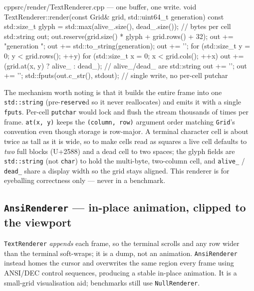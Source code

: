 \documentclass[
	english,
	letterpaper, oneside
]{article}
\begin{document}
\begin{sourcecode}{cpp}{src/render/TextRenderer.cpp --- one buffer, one write.}
void TextRenderer::render(const Grid& grid, std::uint64_t generation) {
  const std::size_t glyph = std::max(alive_.size(), dead_.size()); // bytes per cell
  std::string out;
  out.reserve(grid.size() * glyph + grid.rows() + 32);
  out += "generation "; out += std::to_string(generation); out += '\n';
  for (std::size_t y = 0; y < grid.rows(); ++y) {
    for (std::size_t x = 0; x < grid.cols(); ++x)
      out += (grid.at(x, y) ? alive_ : dead_);   // alive_/dead_ are std::string
    out += '\n';
  }
  out += '\n';
  std::fputs(out.c_str(), stdout);               // single write, no per-cell putchar
}
\end{sourcecode}

The mechanism worth noting is that it builds the entire frame into one
\texttt{std::string} (pre-\texttt{reserve}d so it never reallocates) and emits it
with a single \texttt{fputs}. Per-cell \texttt{putchar} would lock and flush the
stream thousands of times per frame. \texttt{at(x, y)} keeps the
\texttt{(column, row)} argument order matching \texttt{Grid}'s convention even
though storage is row-major. A terminal character cell is about twice as tall as
it is wide, so to make cells read as squares a live cell defaults to \emph{two}
full blocks (U+2588) and a dead cell to two spaces; the glyph fields are
\texttt{std::string} (not \texttt{char}) to hold the multi-byte, two-column cell,
and \texttt{alive\_} / \texttt{dead\_} share a display width so the grid stays
aligned. This renderer is for eyeballing correctness only --- never in a
benchmark.

\subsection{\texttt{AnsiRenderer} --- in-place animation, clipped to the viewport}
\label{sec:ansi}

\texttt{TextRenderer} \emph{appends} each frame, so the terminal scrolls and any
row wider than the terminal soft-wraps; it is a dump, not an animation.
\texttt{AnsiRenderer} instead homes the cursor and overwrites the same region
every frame using ANSI/DEC control sequences, producing a stable in-place
animation. It is a small-grid visualisation aid; benchmarks still use
\texttt{NullRenderer}.
\end{document}
